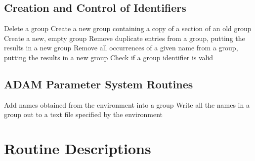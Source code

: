 \subsection{Creation and Control of Identifiers}

            {Delete a group}
            {Create a new group containing a copy of a section of an old group}
            {Create a new, empty group}
            {Remove duplicate entries from a group, putting the results in a new
group}
            {Remove all occurrences of a given name from a group, putting the results in a new group}
            {Check if a group identifier is valid}

\subsection{\label{SEC:ADAM}ADAM Parameter System Routines}


            {Add names obtained from the environment into a group}
            {Write all the names in a group out to a text file specified by the
environment}


\newpage
\section{\label{APP:SPEC}Routine Descriptions}

\small

